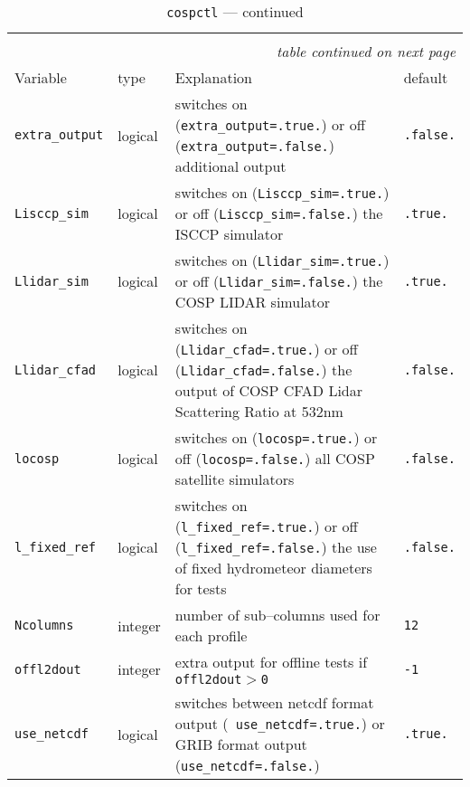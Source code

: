 \begin{longtable}{l@{\extracolsep\fill}lp{5.0cm}p{3.0cm}}
\hline\hline\caption[Namelist {\tt cospctl}]{Namelist
  {\tt cospctl}}\\\hline\label{tabcospctl}
\endfirsthead
\caption[]{{\tt cospctl} --- continued}\\\hline
\endhead
\hline\multicolumn{4}{r}{\slshape table continued on next page}\\
\endfoot
\hline %
\endlastfoot
Variable & type & Explanation & default \\\hline
{\tt extra\_output}\index{namelist variables!extra\_output} 
 & logical & switches on ({\tt extra\_output=.true.}) or off
({\tt extra\_output=.false.}) additional output & {\tt .false.}\\
{\tt Lisccp\_sim}\index{namelist variables!Lisccp\_sim}
 & logical & switches on ({\tt Lisccp\_sim=.true.}) or off
({\tt Lisccp\_sim=.false.}) the ISCCP simulator & {\tt .true.}\\
{\tt Llidar\_sim}\index{namelist variables!Llidar\_sim}
 & logical & switches on ({\tt Llidar\_sim=.true.}) or off
({\tt Llidar\_sim=.false.}) the COSP LIDAR simulator & {\tt .true.}\\
{\tt Llidar\_cfad}\index{namelist variables!Llidar\_cfad}
 & logical & switches on ({\tt Llidar\_cfad=.true.}) or off
({\tt Llidar\_cfad=.false.}) the output of COSP CFAD Lidar Scattering
Ratio at 532nm& {\tt .false.}\\
{\tt locosp}\index{namelist variables!locosp}
 & logical & switches on ({\tt locosp=.true.}) or off
({\tt locosp=.false.}) all COSP satellite simulators & {\tt .false.}\\
{\tt l\_fixed\_ref}\index{namelist variables!l\_fixed\_ref}
 & logical & switches on ({\tt l\_fixed\_ref=.true.}) or
off ({\tt l\_fixed\_ref=.false.}) the use of fixed hydrometeor
diameters for tests & {\tt .false.}\\
{\tt Ncolumns}\index{namelist variables!Ncolumns}
 & integer & number of sub--columns used for each
profile & {\tt 12} \\
{\tt offl2dout}\index{namelist variables!offl2dout}
 & integer & extra output for offline tests if {\tt
  offl2dout$>$0} 
& {\tt -1} \\
{\tt use\_netcdf}\index{namelist variables!use\_netcdf}
 & logical & switches between netcdf format output ({\tt
  use\_netcdf=.true.}) 
or GRIB format output ({\tt use\_netcdf=.false.})
& {\tt .true.}\\
\hline 
\end{longtable}

